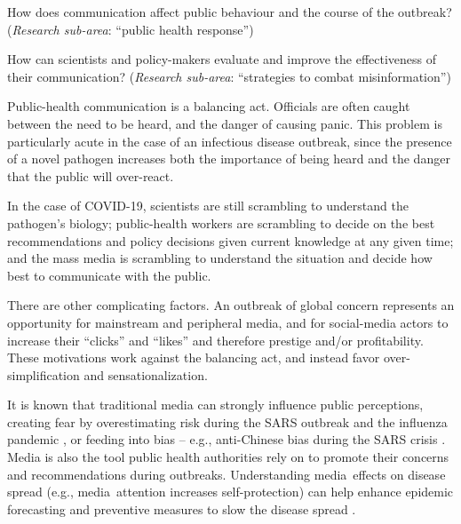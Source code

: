 How does communication affect public behaviour and the course of the outbreak? (\emph{Research sub-area}: ``public health response'')  

 How can scientists and policy-makers evaluate and improve the effectiveness of their communication? (\emph{Research sub-area}: ``strategies to combat misinformation'')


Public-health communication is a balancing act. Officials are often caught between the need to be heard, and the danger of causing panic. This problem is particularly acute in the case of an infectious disease outbreak, since the presence of a novel pathogen increases both the importance of being heard and the danger that the public will over-react. 

In the case of COVID-19, scientists are still scrambling to understand the pathogen's biology; public-health workers are scrambling to decide on the best recommendations and policy decisions given current knowledge at any given time; and the mass media is scrambling to understand the situation and decide how best to communicate with the public. 

There are other complicating factors. An outbreak of global concern represents an opportunity for mainstream and peripheral media, and for social-media actors to increase their ``clicks'' and ``likes'' and therefore prestige and/or profitability. These motivations work against the balancing act, and instead favor over-simplification and sensationalization.

It is known that traditional media can strongly influence public perceptions, creating fear by overestimating risk during the SARS outbreak \citep{BerrWhar07} and the influenza pandemic \citep{TchuDube11}, or feeding into bias -- e.g., anti-Chinese bias during the SARS crisis \citep{HuanLeun06}.
Media is also the tool public health authorities rely on to promote their concerns and recommendations during outbreaks.  Understanding media effects on disease spread (e.g., media attention increases self-protection) can help enhance epidemic forecasting and preventive measures to slow the disease spread \citep{KimFast19}.  

